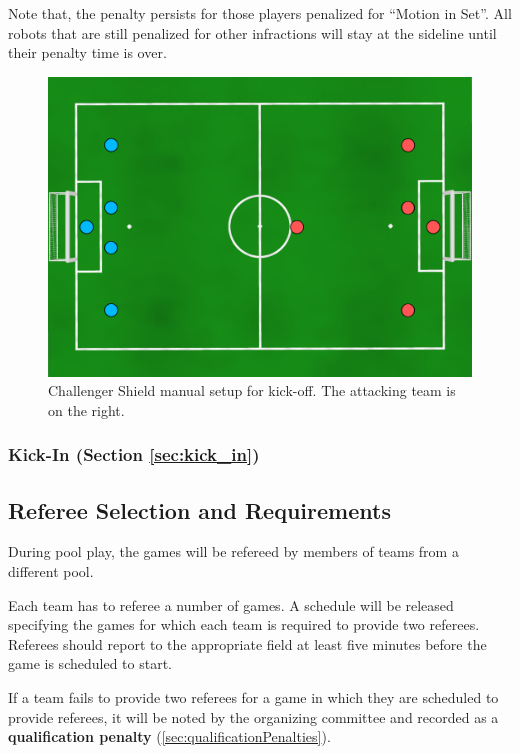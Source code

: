 Note that, the penalty persists for those players penalized for ``Motion in Set''. All robots that are still penalized for other infractions will stay at the sideline until their penalty time is over.

\begin{figure}[t]
\centerline{\includegraphics[width=\columnwidth]{figs/manual-placement-cs.pdf}}
\caption{Challenger Shield manual setup for kick-off.  The attacking team is on the right.}
\label{fig:ko-manual}
\end{figure}


\subsubsection{Kick-In (Section \ref{sec:kick_in})}

\subsection{Referee Selection and Requirements}
\label{sec:refSelection}
During pool play, the games will be refereed by members of teams from a different pool.

Each team has to referee a number of games. A schedule will be released specifying the games for which each team is required to provide two referees. Referees should report to the appropriate field at least five minutes before the game is scheduled to start.

If a team fails to provide two referees for a game in which they are scheduled to provide referees, it will be noted by the organizing committee and recorded as a \textbf{qualification penalty} (\cref{sec:qualificationPenalties}).

